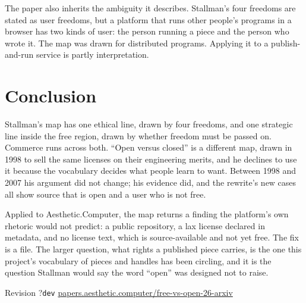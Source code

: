 \documentclass[10pt,letterpaper,twocolumn]{article}
\newcommand{\acdot}{{\color{acpink}.}}
\newcommand{\ac}{Aesthetic{\acdot}Computer}
\newcommand{\term}[1]{``#1''}
\providecommand{\paperhash}{dev}\providecommand{\paperrev}{?}}
\begin{document}
The paper also inherits the ambiguity it describes. Stallman's four freedoms are stated as user freedoms, but a platform that runs other people's programs in a browser has two kinds of user: the person running a piece and the person who wrote it. The map was drawn for distributed programs. Applying it to a publish-and-run service is partly interpretation.

\section{Conclusion}

Stallman's map has one ethical line, drawn by four freedoms, and one strategic line inside the free region, drawn by whether freedom must be passed on. Commerce runs across both. \term{Open versus closed} is a different map, drawn in 1998 to sell the same licenses on their engineering merits, and he declines to use it because the vocabulary decides what people learn to want. Between 1998 and 2007 his argument did not change; his evidence did, and the rewrite's new cases all show source that is open and a user who is not free.

Applied to \ac{}, the map returns a finding the platform's own rhetoric would not predict: a public repository, a lax license declared in metadata, and no license text, which is source-available and not yet free. The fix is a file. The larger question, what rights a published piece carries, is the one this project's vocabulary of pieces and handles has been circling, and it is the question Stallman would say the word \term{open} was designed not to raise.


\setlength{\bibsep}{0.6pt plus 0.2ex}
{\footnotesize}

\vspace{0.8em}
\begin{center}
\footnotesize\sffamily\color{acgray}
Revision \paperrev\;\textperiodcentered\;\texttt{\paperhash}\;\textperiodcentered\;
\href{https://papers.aesthetic.computer/free-vs-open-26-arxiv.pdf}{papers.aesthetic.computer/free-vs-open-26-arxiv}
\end{center}
\end{document}

